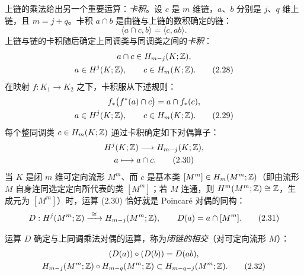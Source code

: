 上链的乘法给出另一个重要运算：\emph{卡积}。设 $c$ 是 $m$ 维链，$a$、$b$ 分别是 $j$、$q$ 维上链，且 $m=j+q$。卡积 $a\cap b$ 是由链与上链的数积确定的链：
\begin{equation}
  \langle a\cap c,b\rangle=\langle c,ab\rangle. \tag{2.27}
\end{equation}
上链与链的卡积随后确定上同调类与同调类之间的\emph{卡积}：
\begin{gather}
  a\cap c\in H_{m-j}(K;\mathbb{Z}),\notag\\
  a\in H^j(K;\mathbb{Z}),\qquad c\in H_m(K;\mathbb{Z}). \tag{2.28}
\end{gather}
在映射 $f: K_1\to K_2$ 之下，卡积服从下述规则：
\begin{gather}
  f_*\bigl(f^*(a)\cap c\bigr)=a\cap f_*(c),\notag\\
  a\in H^j(K;\mathbb{Z}),\qquad c\in H_m(K;\mathbb{Z}). \tag{2.29}
\end{gather}
每个整同调类 $c\in H_m(K;\mathbb{Z})$ 通过卡积确定如下对偶算子：
\begin{gather}
  H^j(K;\mathbb{Z})\longrightarrow H_{m-j}(K;\mathbb{Z}),\notag\\
  a\longmapsto a\cap c. \tag{2.30}
\end{gather}
当 $K$ 是闭 $m$ 维可定向流形 $M^m$、而 $c$ 是基本类 $[M^m]\in H_m(M^m;\mathbb{Z})$（即由流形 $M$ 自身连同选定定向所代表的类 $[M^m]$；若 $M$ 连通，则 $H^m(M^m;\mathbb{Z})\cong\mathbb{Z}$，生成元为 $[M^m]$）时，运算 (2.30) 恰好就是 Poincaré 对偶的同构：
\begin{equation}
  D: H^j(M^m;\mathbb{Z})\xrightarrow{\ \cong\ }H_{m-j}(M^m;\mathbb{Z}),\qquad
  D(a)=a\cap[M^m]. \tag{2.31}
\end{equation}

运算 $D$ 确定与上同调乘法对偶的运算，称为\emph{闭链的相交}（对可定向流形 $M$）：
\begin{gather}
  (D(a))\circ(D(b))=D(ab),\notag\\
  H_{m-j}(M^m;\mathbb{Z})\circ H_{m-q}(M^m;\mathbb{Z})
  \subset H_{m-q-j}(M^m;\mathbb{Z}). \tag{2.32}
\end{gather}

